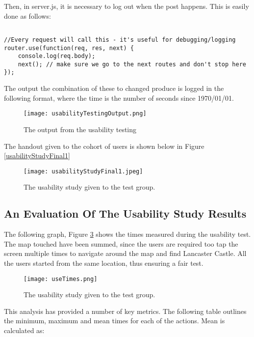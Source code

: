 \documentclass[a4paper]{article}
\begin{document}
Then, in server.js, it is necessary to log out when the post happens. This is easily done as follows:
\begin{lstlisting}[label=Usability testing backend,caption=Usability testing backend]

//Every request will call this - it's useful for debugging/logging
router.use(function(req, res, next) {
    console.log(req.body);
    next(); // make sure we go to the next routes and don't stop here
});
\end{lstlisting} 

The output the combination of these to changed produce is logged in the following format, where the time is the number of seconds since 1970/01/01.

\begin{figure}[H]
\centering
\texttt{[image: usabilityTestingOutput.png]}
\caption{The output from the usability testing
}
\label{fig:usabilityOut}
\end{figure}

The handout given to the cohort of users is shown below in Figure \ref{usabilityStudyFinal1}

\begin{figure}[H]
\centering
\texttt{[image: usabilityStudyFinal1.jpeg]}
\caption{ The usability study given to the test group.
}
\label{fig:usabilityStudyFinal1}
\end{figure}

\subsection{An Evaluation Of The Usability Study Results }

The following graph, Figure \ref{fig:useTimes} shows the times measured during the usability test. The map touched have been summed, since the users are required too tap the screen multiple times to navigate around the map and find Lancaster Castle. All the users started from the same location, thus ensuring a fair test.

\begin{figure}[H]
\centering
\texttt{[image: useTimes.png]}
\caption{ The usability study given to the test group.
}
\label{fig:useTimes}
\end{figure}

This analysis has provided a number of key metrics. The following table outlines the minimum, maximum and mean times for each of the actions. Mean is calculated as:
\end{document}
